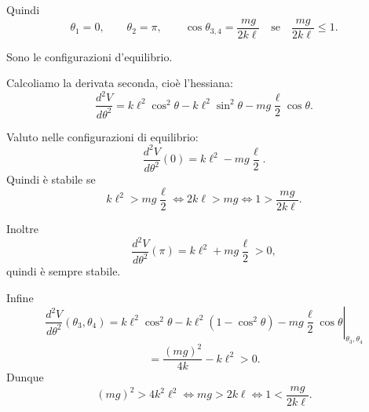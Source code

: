 \begin{example}{}
Quindi
\[
\theta_1=0,
\qquad
\theta_2=\pi,
\qquad
\cos\theta_{3,4}
=
\frac{mg}{2k\ell}
\quad
\text{se}
\quad
\frac{mg}{2k\ell}\leq 1.
\]

Sono le configurazioni d'equilibrio.

Calcoliamo la derivata seconda, cioè l'hessiana:
\[
\frac{d^2V}{d\theta^2}
=
k\ell^2\cos^2\theta
-
k\ell^2\sin^2\theta
-
mg\frac{\ell}{2}\cos\theta.
\]

Valuto nelle configurazioni di equilibrio:
\[
\frac{d^2V}{d\theta^2}(0)
=
k\ell^2
-
mg\frac{\ell}{2}.
\]
Quindi è stabile se
\[
k\ell^2>mg\frac{\ell}{2}
\Longleftrightarrow
2k\ell>mg
\Longleftrightarrow
1>\frac{mg}{2k\ell}.
\]

Inoltre
\[
\frac{d^2V}{d\theta^2}(\pi)
=
k\ell^2
+
mg\frac{\ell}{2}
>
0,
\]
quindi è sempre stabile.

Infine
\[
\left.
\frac{d^2V}{d\theta^2}(\theta_3,\theta_4)
=
k\ell^2\cos^2\theta
-
k\ell^2(1-\cos^2\theta)
-
mg\frac{\ell}{2}\cos\theta
\right|_{\theta_3,\theta_4}
\]
\[
=
\frac{(mg)^2}{4k}
-
k\ell^2
>
0.
\]
Dunque
\[
(mg)^2>4k^2\ell^2
\Longleftrightarrow
mg>2k\ell
\Longleftrightarrow
1<
\frac{mg}{2k\ell}.
\]









  \begin{center}
\end{center}
\end{example}
